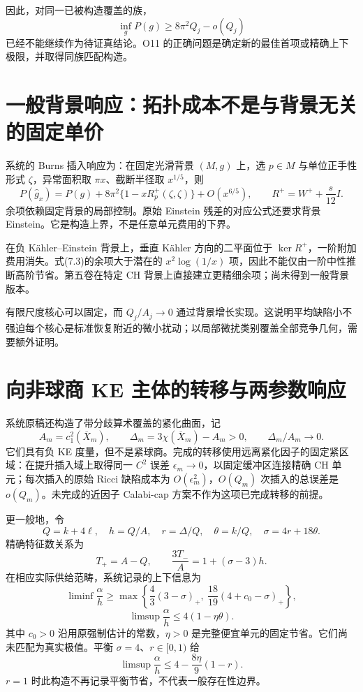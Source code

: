 \documentclass[UTF8,11pt,openany,fontset=none]{ctexbook}
\theoremstyle{definition}
\theoremstyle{remark}
\begin{document}
因此，对同一已被构造覆盖的族， \[
 \inf_gP(g)\ge8\pi^2Q_j-o(Q_j)
\] 已经不能继续作为待证真结论。O11 的正确问题是确定新的最佳首项或精确上下极限，并取得同族匹配构造。

\section{一般背景响应：拓扑成本不是与背景无关的固定单价}\label{v7-ux4e00ux822cux80ccux666fux54cdux5e94ux62d3ux6251ux6210ux672cux4e0dux662fux4e0eux80ccux666fux65e0ux5173ux7684ux56faux5b9aux5355ux4ef7}

系统的 Burns 插入响应为：在固定光滑背景 \((M,g)\) 上，选 \(p\in M\) 与单位正手性形式 \(\zeta\)，异常面积取 \(\pi x\)、截断半径取 \(x^{1/5}\)，则 \[
 P(\widehat g_x)=P(g)+8\pi^2\{1-xR_p^+(\zeta,\zeta)\}+O(x^{6/5}),
 \qquad R^+=W^++\frac{s}{12}I.
\tag{7.3}
\] 余项依赖固定背景的局部控制。原始 Einstein 残差的对应公式还要求背景 Einstein。它是构造上界，不是任意单元费用的下界。

在负 Kähler--Einstein 背景上，垂直 Kähler 方向的二平面位于 \(\ker R^+\)，一阶附加费用消失。式(7.3)的余项大于潜在的 \(x^2\log(1/x)\) 项，因此不能仅由一阶中性推断高阶节省。第五卷在特定 CH 背景上直接建立更精细余项；尚未得到一般背景版本。\cite{B01}

有限尺度核心可以固定，而 \(Q_j/A_j\to0\) 通过背景增长实现。这说明平均缺陷小不强迫每个核心是标准恢复附近的微小扰动；以局部微扰类别覆盖全部竞争几何，需要额外证明。

\section{向非球商 KE 主体的转移与两参数响应}\label{v7-ux5411ux975eux7403ux5546-ke-ux4e3bux4f53ux7684ux8f6cux79fbux4e0eux4e24ux53c2ux6570ux54cdux5e94}

系统原稿还构造了带分歧算术覆盖的紧化曲面，记 \[
 A_m=c_1^2(\overline X_m),\qquad
 \Delta_m=3\chi(\overline X_m)-A_m>0,
 \qquad\Delta_m/A_m\to0.
\] 它们具有负 KE 度量，但不是紧球商。完成的转移使用远离紧化因子的固定紧区域：在提升插入域上取得同一 \(C^2\) 误差 \(\epsilon_m\to0\)，以固定缓冲区连接精确 CH 单元；每次插入的原始 Ricci 缺陷成本为 \(O(\epsilon_m^2)\)，\(O(Q_m)\) 次插入的总误差是 \(o(Q_m)\)。未完成的近因子 Calabi-cap 方案不作为这项已完成转移的前提。\cite{B01,B02,B05}

更一般地，令 \[
 Q=k+4\ell,\quad h=Q/A,\quad
 r=\Delta/Q,\quad\theta=k/Q,\quad\sigma=4r+18\theta.
\] 精确特征数关系为 \[
 T_+=A-Q,\qquad \frac{3T_-}{A}=1+(\sigma-3)h.
\] 在相应实际供给范畴，系统记录的上下信息为 \[
 \liminf\frac\alpha h\ge
 \max\left\{\frac43(3-\sigma)_+,\
 \frac{18}{19}(4+c_0-\sigma)_+\right\},
\tag{7.4}
\] \[
 \limsup\frac\alpha h\le4(1-\eta\theta).
\tag{7.5}
\] 其中 \(c_0>0\) 沿用原强制估计的常数，\(\eta>0\) 是完整便宜单元的固定节省。它们尚未匹配为真实极值。平衡 \(\sigma=4\)、\(r\in[0,1)\) 给 \[
 \limsup\frac\alpha h\le4-\frac{8\eta}{9}(1-r).
\] \(r=1\) 时此构造不再记录平衡节省，不代表一般存在性边界。
\end{document}
